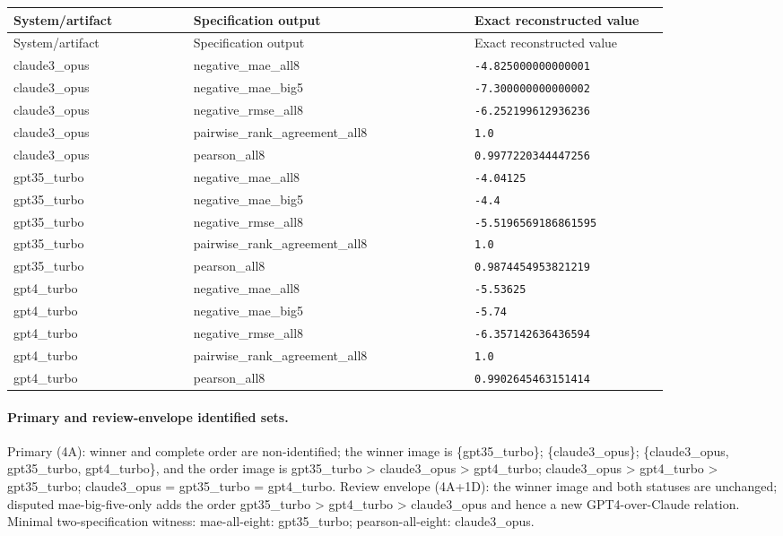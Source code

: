 \begingroup
\scriptsize
\begin{longtable}{@{}p{0.25\linewidth}p{0.39\linewidth}p{0.27\linewidth}@{}}
\toprule
System/artifact & Specification output & Exact reconstructed value \\
\midrule
\endfirsthead
\toprule System/artifact & Specification output & Exact reconstructed value \\
\midrule
\endhead
claude3\_opus & negative\_mae\_all8 & \texttt{-4.825000000000001} \\
claude3\_opus & negative\_mae\_big5 & \texttt{-7.300000000000002} \\
claude3\_opus & negative\_rmse\_all8 & \texttt{-6.252199612936236} \\
claude3\_opus & pairwise\_rank\_agreement\_all8 & \texttt{1.0} \\
claude3\_opus & pearson\_all8 & \texttt{0.9977220344447256} \\
gpt35\_turbo & negative\_mae\_all8 & \texttt{-4.04125} \\
gpt35\_turbo & negative\_mae\_big5 & \texttt{-4.4} \\
gpt35\_turbo & negative\_rmse\_all8 & \texttt{-5.5196569186861595} \\
gpt35\_turbo & pairwise\_rank\_agreement\_all8 & \texttt{1.0} \\
gpt35\_turbo & pearson\_all8 & \texttt{0.9874454953821219} \\
gpt4\_turbo & negative\_mae\_all8 & \texttt{-5.53625} \\
gpt4\_turbo & negative\_mae\_big5 & \texttt{-5.74} \\
gpt4\_turbo & negative\_rmse\_all8 & \texttt{-6.357142636436594} \\
gpt4\_turbo & pairwise\_rank\_agreement\_all8 & \texttt{1.0} \\
gpt4\_turbo & pearson\_all8 & \texttt{0.9902645463151414} \\
\bottomrule
\end{longtable}
\endgroup

\paragraph{Primary and review-envelope identified sets.} Primary (4A): winner and complete order are non-identified; the winner image is \{gpt35\_turbo\}; \{claude3\_opus\}; \{claude3\_opus, gpt35\_turbo, gpt4\_turbo\}, and the order image is gpt35\_turbo > claude3\_opus > gpt4\_turbo; claude3\_opus > gpt4\_turbo > gpt35\_turbo; claude3\_opus = gpt35\_turbo = gpt4\_turbo. Review envelope (4A+1D): the winner image and both statuses are unchanged; disputed mae-big-five-only adds the order gpt35\_turbo > gpt4\_turbo > claude3\_opus and hence a new GPT4-over-Claude relation. Minimal two-specification witness: mae-all-eight: gpt35\_turbo; pearson-all-eight: claude3\_opus.

